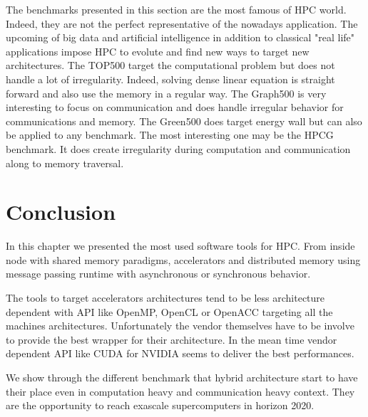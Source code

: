The benchmarks presented in this section are the most famous of HPC world. 
Indeed, they are not the perfect representative of the nowadays application. 
The upcoming of big data and artificial intelligence in addition to classical "real life" applications impose HPC to evolute and find new ways to target new architectures. 
The TOP500 target the computational problem but does not handle a lot of irregularity. 
Indeed, solving dense linear equation is straight forward and also use the memory in a regular way.
The Graph500 is very interesting to focus on communication and does handle irregular behavior for communications and memory. 
The Green500 does target energy wall but can also be applied to any benchmark. 
The most interesting one may be the HPCG benchmark. 
It does create irregularity during computation and communication along to memory traversal. 

\section{Conclusion}
In this chapter we presented the most used software tools for HPC. 
From inside node with shared memory paradigms, accelerators and distributed memory using message passing runtime with asynchronous or synchronous behavior. 

The tools to target accelerators architectures tend to be less architecture dependent with API like OpenMP, OpenCL or OpenACC targeting all the machines architectures. 
Unfortunately the vendor themselves have to be involve to provide the best wrapper for their architecture. 
In the mean time vendor dependent API like CUDA for NVIDIA seems to deliver the best performances.

We show through the different benchmark that hybrid architecture start to have their place even in computation heavy and communication heavy context. 
They are the opportunity to reach exascale supercomputers in horizon 2020.  


